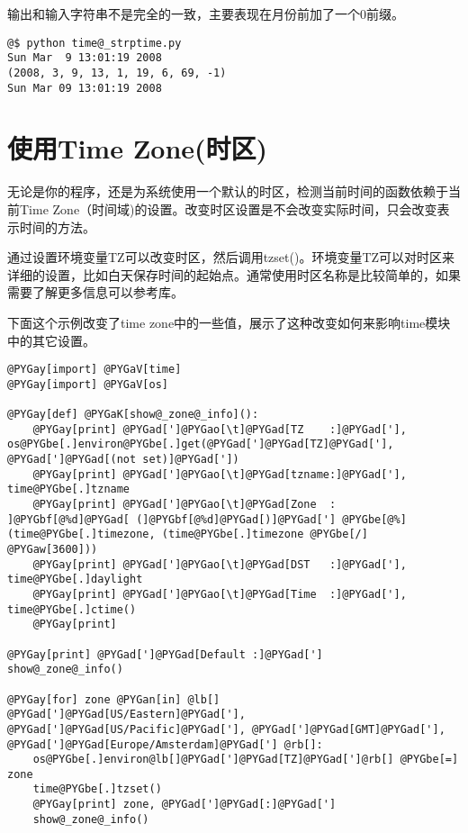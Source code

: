 \documentclass[a4paper,10pt,english]{manual}
\begin{document}
输出和输入字符串不是完全的一致，主要表现在月份前加了一个0前缀。

\begin{Verbatim}[commandchars=@\[\]]
@$ python time@_strptime.py
Sun Mar  9 13:01:19 2008
(2008, 3, 9, 13, 1, 19, 6, 69, -1)
Sun Mar 09 13:01:19 2008
\end{Verbatim}


\section{使用Time Zone(时区)}

无论是你的程序，还是为系统使用一个默认的时区，检测当前时间的函数依赖于当前Time Zone（时间域)的设置。改变时区设置是不会改变实际时间，只会改变表示时间的方法。

通过设置环境变量TZ可以改变时区，然后调用tzset()。环境变量TZ可以对时区来详细的设置，比如白天保存时间的起始点。通常使用时区名称是比较简单的，如果需要了解更多信息可以参考库。

下面这个示例改变了time zone中的一些值，展示了这种改变如何来影响time模块中的其它设置。

\begin{Verbatim}[commandchars=@\[\]]
@PYGay[import] @PYGaV[time]
@PYGay[import] @PYGaV[os]

@PYGay[def] @PYGaK[show@_zone@_info]():
    @PYGay[print] @PYGad[']@PYGao[\t]@PYGad[TZ    :]@PYGad['], os@PYGbe[.]environ@PYGbe[.]get(@PYGad[']@PYGad[TZ]@PYGad['], @PYGad[']@PYGad[(not set)]@PYGad['])
    @PYGay[print] @PYGad[']@PYGao[\t]@PYGad[tzname:]@PYGad['], time@PYGbe[.]tzname
    @PYGay[print] @PYGad[']@PYGao[\t]@PYGad[Zone  : ]@PYGbf[@%d]@PYGad[ (]@PYGbf[@%d]@PYGad[)]@PYGad['] @PYGbe[@%] (time@PYGbe[.]timezone, (time@PYGbe[.]timezone @PYGbe[/] @PYGaw[3600]))
    @PYGay[print] @PYGad[']@PYGao[\t]@PYGad[DST   :]@PYGad['], time@PYGbe[.]daylight
    @PYGay[print] @PYGad[']@PYGao[\t]@PYGad[Time  :]@PYGad['], time@PYGbe[.]ctime()
    @PYGay[print]

@PYGay[print] @PYGad[']@PYGad[Default :]@PYGad[']
show@_zone@_info()

@PYGay[for] zone @PYGan[in] @lb[] @PYGad[']@PYGad[US/Eastern]@PYGad['], @PYGad[']@PYGad[US/Pacific]@PYGad['], @PYGad[']@PYGad[GMT]@PYGad['], @PYGad[']@PYGad[Europe/Amsterdam]@PYGad['] @rb[]:
    os@PYGbe[.]environ@lb[]@PYGad[']@PYGad[TZ]@PYGad[']@rb[] @PYGbe[=] zone
    time@PYGbe[.]tzset()
    @PYGay[print] zone, @PYGad[']@PYGad[:]@PYGad[']
    show@_zone@_info()
\end{Verbatim}
\end{document}
